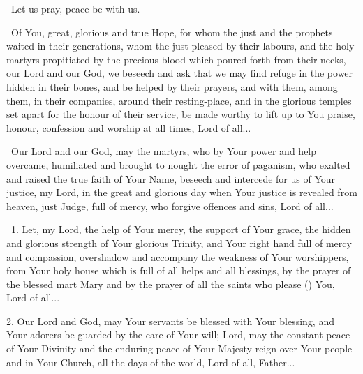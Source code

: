 \documentclass[12pt,twoside,a5paper]{article}
\begin{document}
\begin{halfparskip}
   \rr~Let us pray, peace be with us.

  \cc~Of You, great, glorious and true Hope, for whom the just and the prophets waited in their generations, whom the just pleased by their labours, and the holy martyrs propitiated by the precious blood which poured forth from their necks, our Lord and our God, we beseech and ask that we may find refuge in the power hidden in their bones, and be helped by their prayers, and with them, among them, in their companies, around their resting-place, and in the glorious temples set apart for the honour of their service, be made worthy to lift up to You praise, honour, confession and worship at all times, Lord of all...

  \cc~Our Lord and our God, may the martyrs, who by Your power and help overcame, humiliated and brought to nought the error of paganism, who exalted and raised the true faith of Your Name, beseech and intercede for us of Your justice, my Lord, in the great and glorious day when Your justice is revealed from heaven, just Judge, full of mercy, who forgive offences and sins, Lord of all...
\end{halfparskip}



\cc~1. Let, my Lord, the help of Your mercy, the support of Your grace, the hidden and glorious strength of Your glorious Trinity, and Your right hand full of mercy and compassion, overshadow and accompany the weakness of Your worshippers, from Your holy house which is full of all helps and all blessings, by the prayer of the blessed mart Mary and by the prayer of all the saints who please () You, Lord of all...

2. Our Lord and God, may Your servants be blessed with Your blessing, and Your adorers be guarded by the care of Your will; Lord, may the constant peace of Your Divinity and the enduring peace of Your Majesty reign over Your people and in Your Church, all the days of the world, Lord of all, Father...
\end{document}
